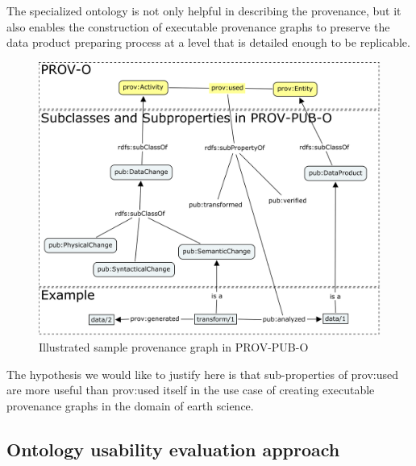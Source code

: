 The specialized ontology is not only helpful in describing the provenance, but it also enables the construction of executable provenance graphs to preserve the data product preparing process at a level that is detailed enough to be replicable.

\begin{figure}
	\includegraphics[width=\textwidth]{prov-pub-o.png}
	\caption{Illustrated sample provenance graph in PROV-PUB-O }
\end{figure}

The hypothesis we would like to justify here is that sub-properties of prov:used are more useful than prov:used itself in the use case of creating executable provenance graphs in the domain of earth science.




\subsection{Ontology usability evaluation approach}
\label{subsec:evaluation}

